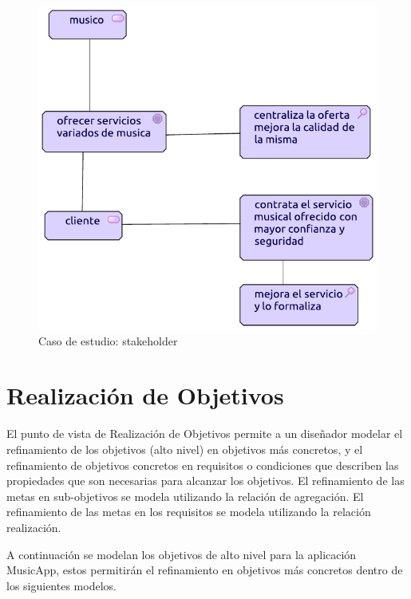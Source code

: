 \begin{figure}[h!]
	\centering
	\includegraphics[width=0.7\linewidth]{Arquitectura/Motivacion/imgs/stakeholder.pdf}
	\caption{Caso de estudio: stakeholder}
	\label{fig:comportamiento}
\end{figure}

\newpage

\section{Realización de Objetivos}
El punto de vista de Realización de Objetivos permite a un diseñador modelar el refinamiento de los objetivos (alto nivel) en objetivos más concretos, y el refinamiento de objetivos concretos en requisitos o condiciones que describen las propiedades que son necesarias para alcanzar los objetivos. El refinamiento de las metas en sub-objetivos se modela utilizando la relación de agregación. El refinamiento de las metas en los requisitos se modela utilizando la relación realización. \cite{ArchiMat55:online} \vspace{\baselineskip}

A continuación se modelan los objetivos de alto nivel para la aplicación MusicApp, estos permitirán el refinamiento en objetivos más concretos dentro de los siguientes modelos.

